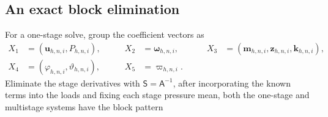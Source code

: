 \documentclass[11pt,a4paper]{article}
\newif\ifcurrentchanges
\newenvironment{currentchange}{\begingroup\ifcurrentchanges\color{red}\fi}{\endgroup}
\newcommand{\chg}[1]{{\ifcurrentchanges\color{red}\fi#1}}
\newcommand{\bs}{\boldsymbol}
\newcommand{\dt}{\Delta t}
\newcommand{\DD}{\mathtt D}
\newcommand{\Aform}{\mathtt A}
\newcommand{\JJ}{\mathtt J}
\newcommand{\BB}{\mathtt B}
\theoremstyle{definition}
\numberwithin{equation}{section}
\begin{document}


\subsection{An exact block elimination}\label{subsec:schur}
\chg{For a one-stage solve, group the coefficient vectors as}
\[
\begin{aligned}
X_1 &= (\bs u_{h,n,i},P_{h,n,i}),
&\qquad
X_2 &= \bs\omega_{h,n,i},
&\qquad
X_3 &= (\bs m_{h,n,i},\bs z_{h,n,i},\bs k_{h,n,i}),\\[1mm]
X_4 &= (\varphi_{h,n,i},\vartheta_{h,n,i}),
&\qquad
X_5 &= \varpi_{h,n,i}.
\end{aligned}
\]
Eliminate the stage derivatives with $\mathsf S=\mathsf A^{-1}$,
%
after incorporating the known terms into the loads and fixing each stage
pressure mean, both the one-stage and multistage systems have the block pattern
\end{document}
